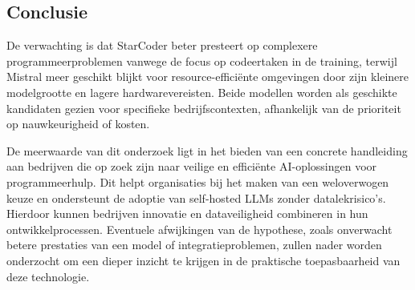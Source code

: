 \subsection{Conclusie}

De verwachting is dat StarCoder beter presteert op complexere programmeerproblemen vanwege de focus op codeertaken in de training, terwijl Mistral meer geschikt blijkt voor resource-efficiënte omgevingen door zijn kleinere modelgrootte en lagere hardwarevereisten. Beide modellen worden als geschikte kandidaten gezien voor specifieke bedrijfscontexten, afhankelijk van de prioriteit op nauwkeurigheid of kosten.

De meerwaarde van dit onderzoek ligt in het bieden van een concrete handleiding aan bedrijven die op zoek zijn naar veilige en efficiënte AI-oplossingen voor programmeerhulp. Dit helpt organisaties bij het maken van een weloverwogen keuze en ondersteunt de adoptie van self-hosted LLMs zonder datalekrisico’s. Hierdoor kunnen bedrijven innovatie en dataveiligheid combineren in hun ontwikkelprocessen. Eventuele afwijkingen van de hypothese, zoals onverwacht betere prestaties van een model of integratieproblemen, zullen nader worden onderzocht om een dieper inzicht te krijgen in de praktische toepasbaarheid van deze technologie.
